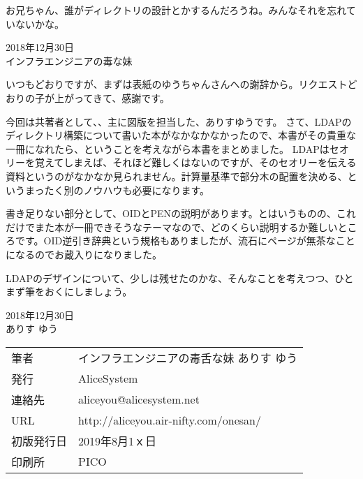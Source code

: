 お兄ちゃん、誰がディレクトリの設計とかするんだろうね。みんなそれを忘れていないかな。

\begin{flushright}
2018年12月30日 \\
インフラエンジニアの毒な妹 \\
\end{flushright}

いつもどおりですが、まずは表紙のゆうちゃんさんへの謝辞から。リクエストどおりの子が上がってきて、感謝です。

今回は共著者として、、主に図版を担当した、ありすゆうです。
さて、LDAPのディレクトリ構築について書いた本がなかなかなかったので、本書がその貴重な一冊になれたら、ということを考えながら本書をまとめました。
LDAPはセオリーを覚えてしまえば、それほど難しくはないのですが、そのセオリーを伝える資料というのがなかなか見られません。計算量基準で部分木の配置を決める、というまったく別のノウハウも必要になります。

書き足りない部分として、OIDとPENの説明があります。とはいうものの、これだけでまた本が一冊できそうなテーマなので、どのくらい説明するか難しいところです。OID逆引き辞典という規格もありましたが、流石にページが無茶なことになるのでお蔵入りになりました。

LDAPのデザインについて、少しは残せたのかな、そんなことを考えつつ、ひとまず筆をおくにしましょう。

\begin{flushright}
2018年12月30日 \\
ありす ゆう
\end{flushright}




\mbox{}
\newpage
\clearpage



\vspace*{\fill}
\begin{tabular}{ll} \toprule
筆者 & インフラエンジニアの毒舌な妹 ありす ゆう\\
発行 & AliceSystem \\
連絡先 & aliceyou@alicesystem.net \\
URL & http://aliceyou.air-nifty.com/onesan/ \\
初版発行日 & 2019年8月1ｘ日 \\
印刷所 & PICO  \\ \bottomrule
\end{tabular}
